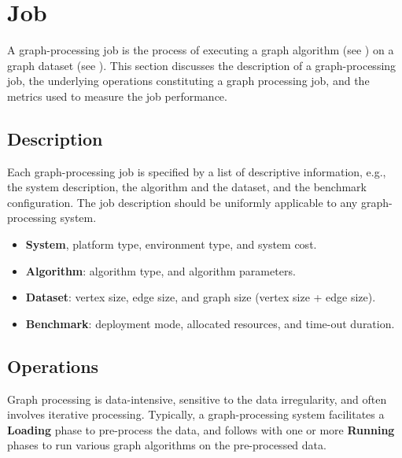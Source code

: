 









\section{Job}
\label{sec:def:job}
A graph-processing job is the process of executing a graph algorithm (see ) on a graph dataset (see ). This section discusses the description of a graph-processing job, the underlying operations constituting a graph processing job, and the metrics used to measure the job performance.

\subsection{Description}
Each graph-processing job is specified by a list of descriptive information, e.g., the system description, the algorithm and the dataset, and the benchmark configuration. The job description should be uniformly applicable to any graph-processing system.

\begin{itemize}
    \item \textbf{System}, platform type, environment type, and system cost.
    \item \textbf{Algorithm}: algorithm type, and algorithm parameters. 
    \item \textbf{Dataset}: vertex size, edge size, and graph size (vertex size + edge size).
    \item \textbf{Benchmark}: deployment mode, allocated resources, and time-out duration.
\end{itemize}


\subsection{Operations}
\label{sec:def:job:operation}
Graph processing is data-intensive, sensitive to the data irregularity, and often involves iterative processing. Typically, a graph-processing system facilitates a \textbf{Loading} phase to pre-process the data, and follows with one or more \textbf{Running} phases to run various graph algorithms on the pre-processed data.

